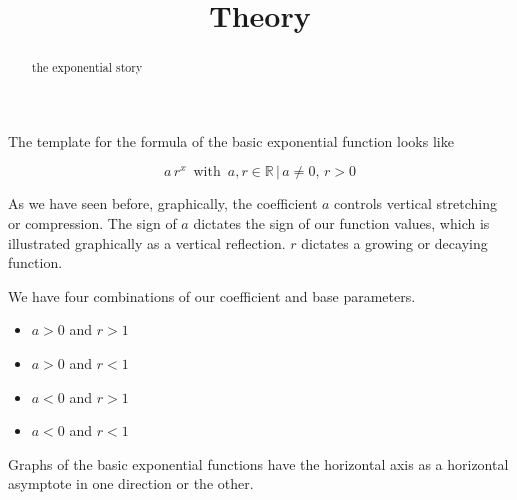 \documentclass{ximera}
\title{Theory}
\begin{document}
\begin{abstract}
the exponential story
\end{abstract}
\maketitle










The template for the formula of the basic exponential function looks like




\[  a \, r^x   \, \text{ with } \,  a, r \in \mathbb{R} \, | \,  a \ne 0, \, r > 0   \]


As we have seen before, graphically, the coefficient $a$ controls vertical stretching or compression. The sign of $a$ dictates the sign of our function values, which is illustrated graphically as a vertical reflection. $r$ dictates a growing or decaying function.




We have four combinations of our coefficient and base parameters.

\begin{itemize}
\item $a>0$ and $r>1$
\item $a>0$ and $r<1$
\item $a<0$ and $r>1$
\item $a<0$ and $r<1$
\end{itemize}


Graphs of the basic exponential functions have the horizontal axis as a horizontal asymptote in one direction or the other.
\end{document}
